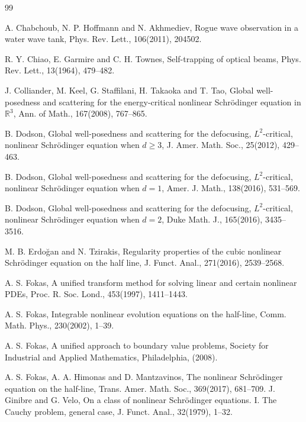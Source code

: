 \documentclass[preprint,compress,12pt]{elsarticle}
\numberwithin{equation}{section}
\begin{document}
\begin{thebibliography}{99}
	

	A. Chabchoub, N. P. Hoffmann and N. Akhmediev, Rogue wave observation in a water wave tank, Phys. Rev. Lett., 106(2011), 204502.
	
	R. Y. Chiao, E. Garmire and C. H. Townes, Self-trapping of optical beams, Phys. Rev. Lett., 13(1964), 479--482.
	
	
	
	J. Colliander, M. Keel, G. Staffilani, H. Takaoka and T. Tao, Global well-posedness and scattering for the energy-critical nonlinear Schr\"{o}dinger equation in $\mathbb{R}^{3}$, Ann. of Math., 167(2008), 767--865.
	
	B. Dodson, Global well-posedness and scattering for the defocusing, $L^{2}$-critical, nonlinear Schr\"{o}dinger equation when $d\geq3$, J. Amer. Math. Soc., 25(2012), 429--463.
	
	B. Dodson, Global well-posedness and scattering for the defocusing, $L^{2}$-critical, nonlinear Schr\"{o}dinger equation when $d=1$, Amer. J. Math., 138(2016), 531--569.
	
	B. Dodson, Global well-posedness and scattering for the defocusing, $L^{2}$-critical, nonlinear Schr\"{o}dinger equation when $d=2$, Duke Math. J., 165(2016), 3435--3516.
	
	M. B. Erdo\u{g}an and N. Tzirakis, Regularity properties of the cubic nonlinear Schr\"{o}dinger equation on the half line, J. Funct. Anal., 271(2016), 2539--2568.
	
	
	
	A. S. Fokas, A unified transform method for solving linear and certain nonlinear PDEs, Proc. R. Soc. Lond., 453(1997), 1411--1443.
	
	A. S. Fokas, Integrable nonlinear evolution equations on the half-line, Comm. Math. Phys., 230(2002), 1--39.
	
	
	A. S. Fokas, A unified approach to boundary value problems, Society for Industrial and Applied Mathematics, Philadelphia, (2008).
	
	
	
	A. S. Fokas, A. A. Himonas and D. Mantzavinos, The nonlinear Schr\"{o}dinger equation on the half-line, Trans. Amer. Math. Soc., 369(2017), 681--709.
	J. Ginibre and G. Velo, On a class of nonlinear Schr\"{o}dinger equations. I. The Cauchy problem, general case, J. Funct. Anal., 32(1979), 1--32.
	

\end{thebibliography}
\end{document}
